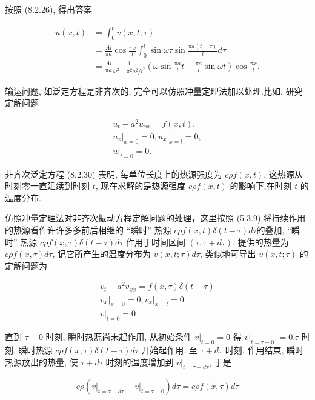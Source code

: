 按照 (8.2.26), 得出答案

$$
\begin{aligned}
u(x, t) & =\int_{0}^{t} v(x, t ; \tau) \\
& =\frac{A l}{\pi a} \cos \frac{\pi x}{l} \int_{0}^{l} \sin \omega \tau \sin \frac{\pi a(t-\tau)}{l} d \tau \\
& =\frac{A l}{\pi a} \frac{1}{\omega^{2}-\pi^{2} a^{2} / l^{2}}\left(\omega \sin \frac{\pi a}{l} t-\frac{\pi a}{l} \sin \omega t\right) \cos \frac{\pi x}{l} .
\end{aligned}
$$

输运问题, 如泛定方程是非齐次的, 完全可以仿照冲量定理法加以处理.比如, 研究定解问题

$$
\begin{gathered}
u_{t}-a^{2} u_{x x}=f(x, t), \\
\left.u_{x}\right|_{x=0}=0,\left.u_{x}\right|_{x=l}=0, \\
\left.u\right|_{t=0}=0 .
\end{gathered}
$$

非齐次泛定方程 (8.2.30) 表明, 每单位长度上的热源强度为 $c \rho f(x, t)$. 这热源从时刻零一直延续到时刻 $t$, 现在求解的是热源强度 $c \rho f(x, t)$ 的影响下,在时刻 $t$ 的温度分布.

仿照冲量定理法对非齐次振动方程定解问题的处理，这里按照 (5.3.9),将持续作用的热源看作许许多多前后相继的 “瞬时” 热源 $c \rho f(x, t) \delta(t-\tau) d \tau$的叠加, “瞬时” 热源 $c \rho f(x, \tau) \delta(t-\tau) d \tau$ 作用于时间区间 $(\tau, \tau+d \tau)$, 提供的热量为 $c \rho f(x, \tau) d \tau$, 记它所产生的温度分布为 $v(x, t ; \tau) d \tau$, 类似地可导出 $v(x, t ; \tau)$ 的定解问题为

$$
\begin{gathered}
v_{t}-a^{2} v_{x x}=f(x, \tau) \delta(t-\tau) \\
\left.v_{x}\right|_{x=0}=0,\left.v_{x}\right|_{x=l}=0 \\
\left.v\right|_{t=0}=0
\end{gathered}
$$

直到 $\tau-0$ 时刻, 瞬时热源尚未起作用, 从初始条件 $\left.v\right|_{t=0}=0$ 得 $\left.v\right|_{t=\tau-0}$
$=0 . \tau$ 时刻, 瞬时热源 $c \rho f(x, \tau) \delta(t-\tau) d \tau$ 开始起作用, 至 $\tau+d \tau$ 时刻, 作用结束, 瞬时热源放出的热量, 使 $\tau+d \tau$ 时刻的温度增加到 $\left.v\right|_{t=\tau+d \tau}$, 于是

$$
c \rho\left(\left.v\right|_{t=\tau+d \tau}-\left.v\right|_{t=\tau-0}\right) d \tau=c \rho f(x, \tau) d \tau
$$

